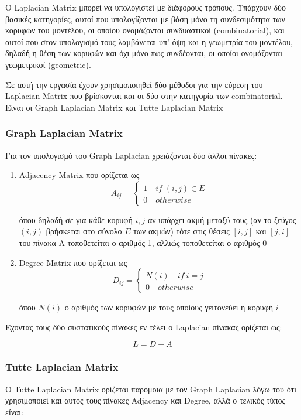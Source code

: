 \documentclass{article}
\begin{document}
Ο Laplacian Matrix μπορεί να υπολογιστεί με διάφορους τρόπους.
Υπάρχουν δύο βασικές κατηγορίες,
αυτοί που υπολογίζονται με βάση μόνο τη συνδεσιμότητα των κορυφών του μοντέλου,
οι οποίου ονομάζονται συνδυαστικοί (combinatorial),
και αυτοί που στον υπολογισμό τους λαμβάνεται υπ' όψη και η γεωμετρία του μοντέλου,
δηλαδή η θέση των κορυφών και όχι μόνο πως συνδέονται,
οι οποίοι ονομάζονται γεωμετρικοί (geometric).

Σε αυτή την εργασία έχουν χρησιμοποιηθεί δύο μέθοδοι για την εύρεση του Laplacian Matrix
που βρίσκονται και οι δύο στην κατηγορία των combinatorial.
Είναι οι Graph Laplacian Matrix και Tutte Laplacian Matrix

\subsubsection{Graph Laplacian Matrix}
Για τον υπολογισμό του Graph Laplacian χρειάζονται δύο άλλοι πίνακες:
\begin{enumerate}
	\item Adjacency Matrix που ορίζεται ως
		\[
			A_{ij} = \begin{cases}
				1 \quad if \; (i, j) \in E \\
				0 \quad otherwise
			\end{cases}
		\]

		όπου δηλαδή σε για κάθε κορυφή $i, j$ αν υπάρχει ακμή μεταξύ τους
		(αν το ζεύγος $(i,j)$ βρήσκεται στο σύνολο $E$ των ακμών)
		τότε στις θέσεις $[i, j]$ και $[j, i]$ του πίνακα Α τοποθετείται ο αριθμός 1,
		αλλιώς τοποθετείται ο αριθμός 0

	\item Degree Matrix που ορίζεται ως
		\[
			D_{ij} = \begin{cases}
				N(i) \quad if \ i=j \\
				0 \quad otherwise
			\end{cases}
		\]

		όπου $N(i)$ ο αριθμός των κορυφών με τους οποίους γειτονεύει η κορυφή $i$
\end{enumerate}

\noindent
Έχοντας τους δύο συστατικούς πίνακες εν τέλει ο Laplacian πίνακας ορίζεται ως:

\[
	L = D - A
\]

\subsubsection{Tutte Laplacian Matrix}
Ο Tutte Laplacian Matrix ορίζεται παρόμοια με τον Graph Laplacian
λόγω του ότι χρησιμοποιεί και αυτός τους πίνακες Adjacency και Degree,
αλλά ο τελικός τύπος είναι:
\end{document}

